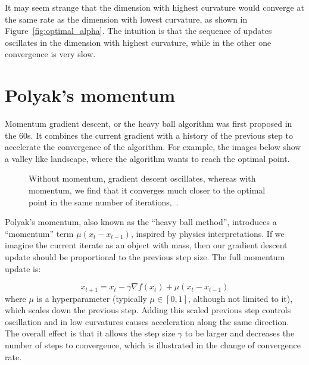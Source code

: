 \documentclass{article}
\begin{document}
It may seem strange that the dimension with highest curvature would converge at the same rate as the dimension with lowest curvature, as shown in Figure~\ref{fig:optimal_alpha}. The intuition is that the sequence of updates oscillates in the dimension with highest curvature, while in the other one convergence is very slow.

\section{Polyak's momentum}
Momentum gradient descent, or the heavy ball algorithm was first proposed in the 60s. It combines the current gradient with a history of the previous step to accelerate the convergence of the algorithm. For example, the images below show a  valley like landscape, where the algorithm wants to reach the optimal point. 

\begin{figure}[H]%
\centering
{}%
\qquad
{}%
\caption{Without momentum, gradient descent oscillates, whereas with momentum, we find that it converges much closer to the optimal point in the same number of iterations,~\cite{goh2017why}.}
\end{figure}

Polyak's momentum, also known as the ``heavy ball method'', introduces a ``momentum'' term $\mu(x_t-x_{t-1})$, inspired by physics interpretations. If we imagine the current iterate as an object with mass, then our gradient descent update should be proportional to the previous step size. The full momentum update is:

\begin{equation}
x_{t+1} = x_t - \gamma \nabla f(x_t) + \mu(x_t-x_{t-1})
\end{equation}
where $\mu$ is a hyperparameter (typically $\mu \in [0,1]$, although not limited to it), which scales down the previous step. Adding this scaled previous step controls oscillation and in low curvatures causes acceleration along the same direction. The overall effect is that it allows the step size $\gamma$ to be larger and decreases the number of steps to convergence, which is illustrated in the change of convergence rate.
\\
\end{document}
